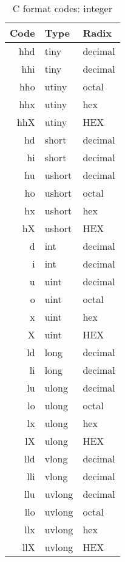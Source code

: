 \documentclass[oneside]{book}
\begin{document}
\begin{table}
\caption{C format codes: integer\label{C format codes: integer}}
\centering
\begin{tabular}[c]{rll}
Code&Type&Radix\\
\hline
hhd&tiny&decimal\\
hhi&tiny&decimal\\
hho&utiny&octal\\
hhx&utiny&hex\\
hhX&utiny&HEX\\
\hline
hd&short&decimal\\
hi&short&decimal\\
hu&ushort&decimal\\
ho&ushort&octal\\
hx&ushort&hex\\
hX&ushort&HEX\\
\hline
d&int&decimal\\
i&int&decimal\\
u&uint&decimal\\
o&uint&octal\\
x&uint&hex\\
X&uint&HEX\\
\hline
ld&long&decimal\\
li&long&decimal\\
lu&ulong&decimal\\
lo&ulong&octal\\
lx&ulong&hex\\
lX&ulong&HEX\\
\hline
lld&vlong&decimal\\
lli&vlong&decimal\\
llu&uvlong&decimal\\
llo&uvlong&octal\\
llx&uvlong&hex\\
llX&uvlong&HEX\\
\end{tabular}
\end{table}
\end{document}
